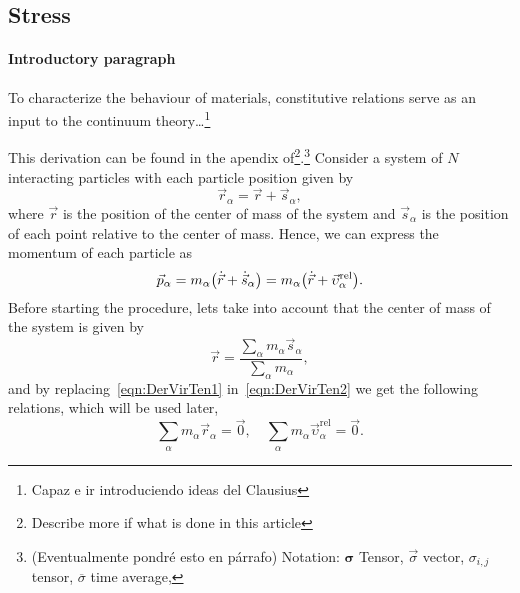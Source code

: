 \documentclass[../../main-notes.tex]{subfiles}
\begin{document}
\subsection{Stress}

\paragraph{Introductory paragraph} To characterize the behaviour of materials, constitutive relations serve as an input to the continuum theory\dots\footnote{Capaz e ir introduciendo ideas del Clausius\citep{clausiusXVIMechanicalTheorem1870}}

This derivation can be found in the apendix of\citep{admalUnifiedInterpretationStress2010}\footnote{Describe more if what is done in this article}.\footnote{(Eventualmente pondré esto en párrafo) Notation:
    $\bm{\sigma}$ Tensor, $\vec{\sigma}$ vector, $\sigma_{i,j}$ tensor, $\overline{\sigma}$ time average, 
}
Consider a system of $N$ interacting particles with each particle position given by
\begin{equation}
    \vec{r}_{\alpha} = \vec{r} + \vec{s}_{\alpha}\label{eqn:DerVirTen1},
\end{equation}
where $\vec{r}$ is the position of the center of mass of the system and $\vec{s}_\alpha$ is the position of each point relative to the center of mass.
Hence, we can express the momentum of each particle as
\begin{equation}
    \vec{p}_\alpha = m_\alpha\qty(\dot{\vec{r}}+\dot{\vec{s}}_\alpha) = m_\alpha\qty(\dot{\vec{r}}+\vec{\upsilon}_\alpha^{\mathrm{rel}}).\label{eqn:DerVirTen2}
\end{equation}
Before starting the procedure, lets take into account that the center of mass of the system is given by
\begin{equation}
    \vec{r} = \frac{\sum_{\alpha}m_\alpha\vec{s}_\alpha}{\sum_{\alpha}m_\alpha}\label{eqn:DerVirTen3},
\end{equation}
and by replacing~\eqref{eqn:DerVirTen1} in~\eqref{eqn:DerVirTen2} we get the following relations, which will be used later,
\begin{equation}
    \sum_\alpha m_\alpha\vec{r}_\alpha = \vec{0},\quad
    \sum_\alpha m_\alpha\vec{\upsilon}_\alpha^{\mathrm{rel}} = \vec{0}.\label{eqn:DerVirTen4}
\end{equation}
\end{document}

